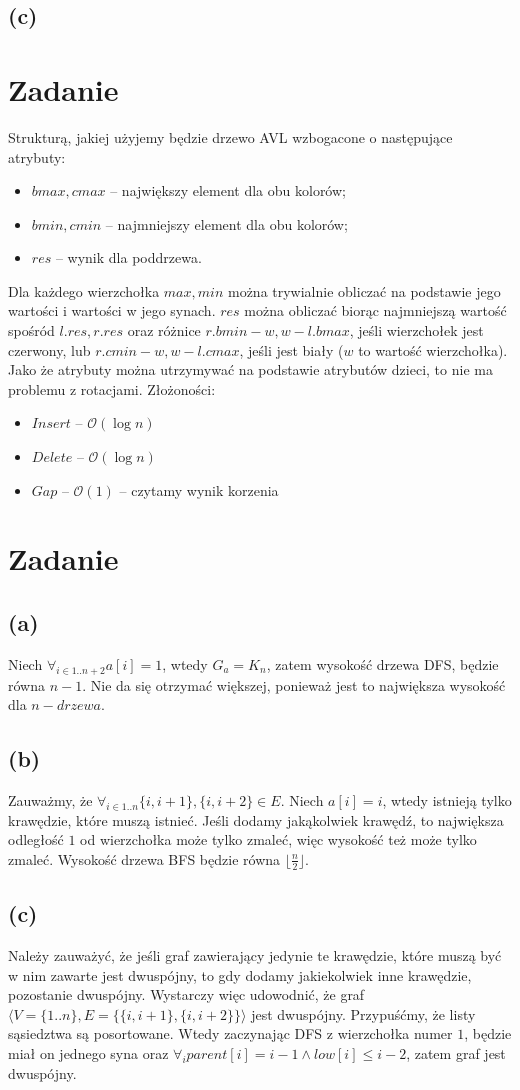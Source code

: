 \documentclass[12pt, a4paper]{article}
\newcommand{\MCALO}{\mathcal{O}}
\newcounter{zadanie}
\newcommand{\zadanie}{\addtocounter{zadanie}{1}\section*{Zadanie \arabic{zadanie}}}
\begin{document}
\subsection*{(c)}

\zadanie{}
Strukturą, jakiej użyjemy będzie drzewo AVL wzbogacone o następujące atrybuty:
\begin{itemize}
  \item $bmax,cmax$ -- największy element dla obu kolorów;
  \item $bmin,cmin$ -- najmniejszy element dla obu kolorów;
  \item $res$ -- wynik dla poddrzewa.
\end{itemize}
Dla każdego wierzchołka $max, min$ można trywialnie obliczać na podstawie jego
wartości i wartości w jego synach. $res$ można obliczać biorąc najmniejszą
wartość spośród $l.res, r.res$ oraz różnice $r.bmin - w, w - l.bmax$, jeśli
wierzchołek jest czerwony, lub $r.cmin - w, w - l.cmax$, jeśli jest biały ($w$
to wartość wierzchołka). Jako że atrybuty można utrzymywać na podstawie
atrybutów dzieci, to nie ma problemu z rotacjami.
Złożoności:
\begin{itemize}
  \item $\mathit{Insert}$ -- $\MCALO(\log{n})$
  \item $\mathit{Delete}$ -- $\MCALO(\log{n})$
  \item $\mathit{Gap}$ -- $\MCALO(1)$ -- czytamy wynik korzenia
\end{itemize}

\zadanie{}
\subsection*{(a)}
Niech $\forall_{i\in{1..n+2}} a[i] = 1$, wtedy $G_a = K_n$, zatem wysokość drzewa
DFS, będzie równa $n-1$. Nie da się otrzymać większej, ponieważ jest to
największa wysokość dla $n-drzewa$.

\subsection*{(b)}
Zauważmy, że $\forall_{i\in{1..n}} \{i,i+1\}, \{i,i+2\} \in E$. Niech $a[i]
= i$, wtedy istnieją tylko krawędzie, które muszą istnieć. Jeśli dodamy
jakąkolwiek krawędź, to największa odległość $1$ od wierzchołka może tylko
zmaleć, więc wysokość też może tylko zmaleć. Wysokość drzewa BFS będzie równa
$\lfloor\frac{n}{2}\rfloor$.

\subsection*{(c)}
Należy zauważyć, że jeśli graf zawierający jedynie te krawędzie, które muszą
być w nim zawarte jest dwuspójny, to gdy dodamy jakiekolwiek inne krawędzie,
pozostanie dwuspójny. Wystarczy więc udowodnić, że graf
$\langle V=\{1..n\},E = \{ \{i,i+1\} , \{i,i+2\} \}\rangle$
jest dwuspójny. Przypuśćmy, że listy sąsiedztwa są posortowane. Wtedy
zaczynając DFS z wierzchołka numer $1$, będzie miał on jednego syna oraz
$\forall_i parent[i] = i-1 \land low[i] \le i-2$, zatem graf jest dwuspójny.
\end{document}
